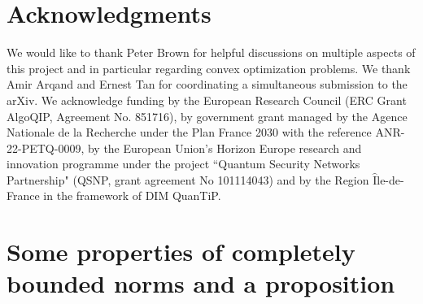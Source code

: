 \documentclass[11pt]{article}
\newcommand{\1}{\ensuremath{\mathbbm{1}}}
\theoremstyle{newdefinition}
\theoremstyle{newplain}
\theoremstyle{myplain}
\begin{document}
\section*{Acknowledgments} We would like to thank Peter Brown for helpful discussions on multiple aspects of this project and in particular regarding convex optimization problems. We thank Amir Arqand and Ernest Tan for coordinating a simultaneous submission to the arXiv. We acknowledge funding by the European Research Council (ERC Grant AlgoQIP, Agreement No. 851716), by government grant managed by the Agence Nationale de la Recherche under the Plan France 2030 with the reference ANR-22-PETQ-0009, by the European Union’s Horizon Europe research and innovation programme under the project ``Quantum Security Networks Partnership" (QSNP, grant agreement No 101114043) and by the Region $\hat{\text{I}}$le-de-France in the framework of DIM QuanTiP. 






\newpage

\appendix

\section{Some properties of completely bounded norms and a proposition}\label{app:Proof.of.baisc.properties}
\end{document}
